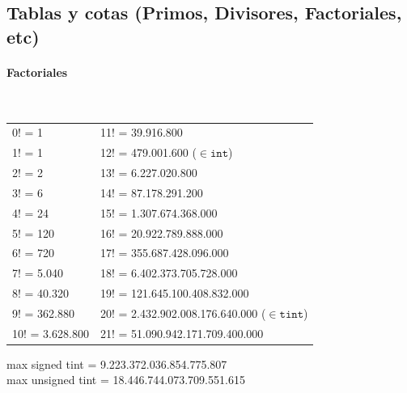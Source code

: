 
\subsection{Tablas y cotas (Primos, Divisores, Factoriales, etc)}
\paragraph{Factoriales} \ \\
\begin{tabular}{l|l}
0! =	1             & 11! = 39.916.800  \\
1! =	1             & 12! =	479.001.600	($\in \mathtt{int}$)\\
2! =	2             & 13! =	6.227.020.800	\\
3! =	6             & 14! =	87.178.291.200	\\
4! =	24            & 15! =	1.307.674.368.000	\\
5! =	120   			  & 16! =	20.922.789.888.000	\\
6! =	720           & 17! =	355.687.428.096.000	\\
7! =	5.040	        & 18! =	6.402.373.705.728.000	\\
8! =	40.320	      & 19! =	121.645.100.408.832.000	\\
9! =	362.880       & 20! =	2.432.902.008.176.640.000	($\in \mathtt{tint}$) \\
10! =	3.628.800     & 21! =	51.090.942.171.709.400.000
\end{tabular}
 
max signed tint = 9.223.372.036.854.775.807 \\
max unsigned tint = 18.446.744.073.709.551.615
